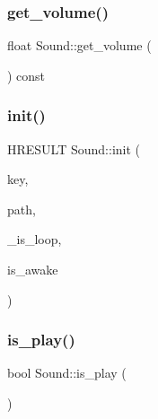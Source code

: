 \mbox{\label{class_sound_af5564dbb59b33f316b74a765122a3257}} 
\subsubsection{\texorpdfstring{get\+\_\+volume()}{get\_volume()}}
{\footnotesize\ttfamily float Sound\+::get\+\_\+volume (\begin{DoxyParamCaption}{ }\end{DoxyParamCaption}) const\hspace{0.3cm}{\ttfamily [inline]}}

\mbox{\label{class_sound_ab8fa1a127fa7364b3d05708eb04eec79}} 
\subsubsection{\texorpdfstring{init()}{init()}}
{\footnotesize\ttfamily H\+R\+E\+S\+U\+LT Sound\+::init (\begin{DoxyParamCaption}\item[{const std\+::string \&}]{key,  }\item[{const W\+C\+H\+AR $\ast$}]{path,  }\item[{const bool}]{\+\_\+is\+\_\+loop,  }\item[{const bool}]{is\+\_\+awake }\end{DoxyParamCaption})}

\mbox{\label{class_sound_af4307ce8def4e623153e6208951ca8bc}} 
\subsubsection{\texorpdfstring{is\+\_\+play()}{is\_play()}}
{\footnotesize\ttfamily bool Sound\+::is\+\_\+play (\begin{DoxyParamCaption}{ }\end{DoxyParamCaption})\hspace{0.3cm}{\ttfamily [inline]}}

\mbox{\label{class_sound_a65b0f66e9123caed2809da366ac4d377}} 
